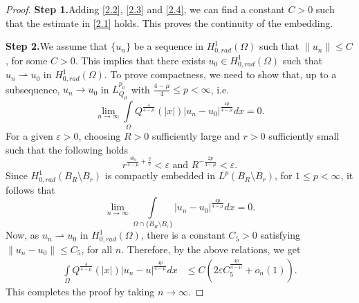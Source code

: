 \documentclass[11pt]{amsart}
\numberwithin{equation}{section}
\newenvironment{step}[1]{\par\noindent\textbf{Step 1.}\space#1}{}
\newenvironment{step2}[1]{\par\noindent\textbf{Step 2.}\space#1}{}
\newcommand{\hr}{H^1_{0, rad}(\Omega)}
\newcommand{\1}{\frac{1}{2}}
\begin{document}
\begin{proof}
\begin{step}
			Adding \eqref{2.2}, \eqref{2.3} and \eqref{2.4}, we can find a constant $C>0$ such that the estimate in \eqref{2.1} holds. This proves the continuity of the embedding.
		\end{step}
		\begin{step2}
			We assume that $\{u_n\}$ be a sequence in $\hr$ such that $\|u_n\|\leq C$, for some $C>0$. This implies that there exists $u_0 \in \hr$ such that $u_n \rightharpoonup u_0$ in $\hr$. To prove compactness, we need to show that, up to a subsequence, $u_n \rightarrow u_0$ in $L^{p_\mu}_{Q_\mu}$ with $\frac{4-\mu}{4} \leq p <\infty$,
			i.e.
			\[ \lim_{n\rightarrow \infty} \int\limits_{\Omega} Q^{\frac{4}{4-\mu}}(|x|) |u_n-u_0|^{\frac{4p}{4-\mu}}dx =0.\]
			For a given $\varepsilon>0$, choosing $R>0$ sufficiently large and $r>0$ sufficiently small such that the following holds
			\[  r^{\frac{4b_0}{4-\mu}+\frac{2}{v}} < \varepsilon \text{ and } R^{-\frac{2p}{4-\mu}} < \varepsilon.\]
			Since  $H^1_{0, rad}(B_R \setminus B_r)$ is compactly embedded in $L^p(B_R \setminus B_r)$, for $1\leq p <\infty$, it follows that 
			\[ \lim_{n \rightarrow \infty}\int\limits_{\Omega \cap \{B_R\setminus B_r\}} |u_n - u_0|^{\frac{4p}{4-\mu}}dx=0.\]
			Now, as $u_n \rightharpoonup u_0$ in $\hr$, there is a constant $C_5>0$ satisfying $\|u_n-u_0\| \leq C_5$, for all $n$. Therefore, by the above relations, we get
			\begin{align*}
				\int\limits_{\Omega} Q^{\frac{4}{4-\mu}}(|x|) |u_n-u|^{\frac{4p}{4-\mu}}dx
				&\leq C ( 2\varepsilon C_5^{\frac{4p}{4-\mu}} + o_n(1)).
			\end{align*}
			This completes the proof by taking $n\to \infty$.
		\end{step2}
	\end{proof}
\end{document}
